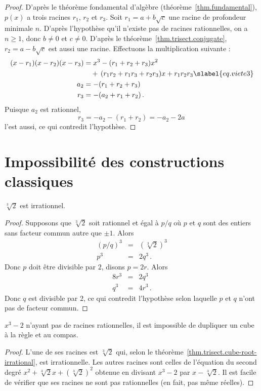 \begin{proof} D'après le théorème fondamental d'algèbre (théorème~\ref{thm.fundamental}), $p(x)$ a trois racines $r_1$, $r_2$ et $r_3$. Soit $r_1=a+b\sqrt{c}$ une racine de profondeur minimale $n$. D'après l'hypothèse qu'il n'existe pas de racines rationnelles, on a $n\geq 1$,  donc $b\neq 0$ et $c\neq 0$. D'après le théorème~\ref{thm.trisect.conjugate}, $r_2=a-b\sqrt{c}$ est aussi une racine. Effectuons la multiplication suivante :
\begin{subequations}
\begin{align}
(x-r_1)(x-r_2)(x-r_3)&=x^3 -(r_1+r_2+r_3)x^2\\
&\quad +\, (r_1r_2+r_1r_3+r_2r_3)x + r_1r_2r_3\slabel{eq.viete3}\\
a_2&=-(r_1+r_2+r_3)\\
r_3&=-(a_2+r_1+r_2)\,.
\end{align}
\end{subequations}
Puisque $a_2$ est  rationnel, 
\[r_3=-a_2-(r_1+r_2)=-a_2-2a\,\]
l'est aussi, ce qui 
contredit l'hypothèse.
\end{proof}


\section{Impossibilité des constructions classiques}\label{s.trisect-impossible}

\begin{theorem}\label{thm.trisect.cube-root-irrational}
$\sqrt[3]{2}$ est irrationnel.
\end{theorem}
\begin{proof}
Supposons que $\sqrt[3]{2}$ soit rationnel et égal à $p/q$ où $p$ et $q$ sont des entiers sans facteur commun autre que $\pm 1$. Alors
\begin{eqnarray*}
(p/q)^3&=&(\sqrt[3]{2})^3\\
p^3&=&2q^3\,.
\end{eqnarray*}
Donc $p$ doit être divisible par $2$, disons $p=2r$. Alors 
\begin{eqnarray*}
8r^3&=&2q^3\\
q^3&=&4r^3\,.
\end{eqnarray*}
Donc $q$ est divisible par $2$, ce qui contredit l'hypothèse selon laquelle $p$ et $q$ n'ont pas de facteur commun.
\end{proof}

\begin{theorem}
$x^3-2$ n'ayant pas de racines rationnelles, il est  impossible de dupliquer un cube à la règle et au  compas.
\end{theorem}
\begin{proof} L'une de ses racines est $\sqrt[3]{2}$ qui, selon le théorème~\ref{thm.trisect.cube-root-irrational}, est irrationnelle. Les autres racines sont celles de l'équation du second degré  $x^2+\sqrt[3]{2}x+(\sqrt[3]{2})^2$ obtenue en divisant $x^3-2$ par $x-\sqrt[3]{2}$. Il est facile de vérifier que ses racines ne sont pas rationnelles (en fait, pas même réelles).
\end{proof}


